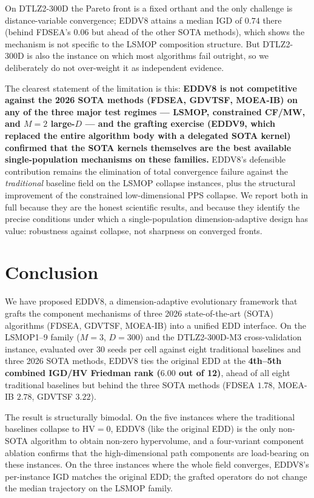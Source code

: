 \documentclass[preprint,12pt]{elsarticle}
\begin{document}
On DTLZ2-300D the Pareto front is a fixed orthant and the only challenge is
distance-variable convergence; EDDV8 attains a median IGD of $0.74$ there
(behind FDSEA's $0.06$ but ahead of the other SOTA methods), which shows
the mechanism is not specific to the LSMOP composition structure. But
DTLZ2-300D is also the instance on which most algorithms fail outright,
so we deliberately do not over-weight it as independent evidence.

The clearest statement of the limitation is this: \textbf{EDDV8 is not
competitive against the 2026 SOTA methods (FDSEA, GDVTSF, MOEA-IB) on any
of the three major test regimes --- LSMOP, constrained CF/MW, and $M=2$
large-$D$ --- and the grafting exercise (EDDV9, which replaced the entire
algorithm body with a delegated SOTA kernel) confirmed that the SOTA
kernels themselves are the best available single-population mechanisms on
these families.} EDDV8's defensible contribution remains the elimination
of total convergence failure against the \emph{traditional} baseline field
on the LSMOP collapse instances, plus the structural improvement of the
constrained low-dimensional PPS collapse. We report both in full because
they are the honest scientific results, and because they identify the
precise conditions under which a single-population dimension-adaptive
design has value: robustness against collapse, not sharpness on converged
fronts.

\section{Conclusion}
\label{sec:conclusion}

We have proposed EDDV8, a dimension-adaptive evolutionary framework that
grafts the component mechanisms of three 2026 state-of-the-art (SOTA)
algorithms (FDSEA, GDVTSF, MOEA-IB) into a unified EDD interface. On the
LSMOP1--9 family ($M = 3$, $D = 300$) and the DTLZ2-300D-M3
cross-validation instance, evaluated over 30 seeds per cell against eight
traditional baselines and three 2026 SOTA methods, EDDV8 ties the original
EDD at the \textbf{4th--5th combined IGD/HV Friedman rank ($6.00$ out of
12)}, ahead of all eight traditional baselines but behind the three SOTA
methods (FDSEA $1.78$, MOEA-IB $2.78$, GDVTSF $3.22$).

The result is structurally bimodal. On the five instances where the
traditional baselines collapse to $\mathrm{HV} = 0$, EDDV8 (like the
original EDD) is the only non-SOTA algorithm to obtain non-zero
hypervolume, and a four-variant component ablation confirms that the
high-dimensional path components are load-bearing on these instances.
On the three instances where the whole field converges, EDDV8's per-instance
IGD matches the original EDD; the grafted operators do not change the
median trajectory on the LSMOP family.
\end{document}
